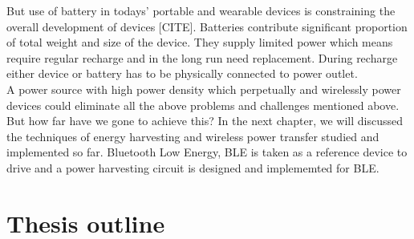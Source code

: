 \documentclass[UKenglish]{ifimaster}  %
\begin{document}
But use of battery in todays'  portable and wearable devices is constraining the overall development of devices 
[CITE]. Batteries contribute significant proportion of total weight and size of the device. They supply limited 
power which means require regular recharge and in the long run need replacement. During recharge either device or 
battery has to be physically connected to power outlet. \\

A power source with high power density which perpetually and wirelessly power devices could eliminate 
all the above problems and challenges mentioned above. But how 
far have we gone to achieve this? In the next chapter, we will discussed the techniques of energy harvesting and 
wireless power transfer studied and implemented so far. Bluetooth Low Energy, BLE is taken as a 
reference device to drive and a power harvesting circuit is designed and implememted for BLE. \\


\section{Thesis outline}
\end{document}
